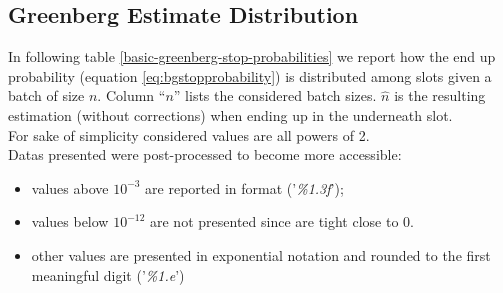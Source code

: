 \begin{appendices}
\section{Greenberg Estimate Distribution}
In following table \ref{basic-greenberg-stop-probabilities} we report how the end  up probability (equation \ref{eq:bgstopprobability}) is distributed among slots given a batch of size $n$.  Column ``$n$'' lists  the considered batch sizes. $\hat{n}$ is the resulting estimation (without corrections) when ending up in the underneath slot.\\  For sake of simplicity considered values are all powers of 2.\\
Datas presented were post-processed to become more accessible:
\begin{itemize}
\item values above $10^{-3}$ are reported in format ('\emph{\%1.3f}');
\item values below $10^{-12}$ are not presented since are tight close to 0.
\item other values are presented in exponential notation and rounded to the first meaningful digit ('\emph{\%1.e}')
\end{itemize}



\begin{sidewaystable}
\flushleft
{}
\end{sidewaystable}
\end{appendices}
